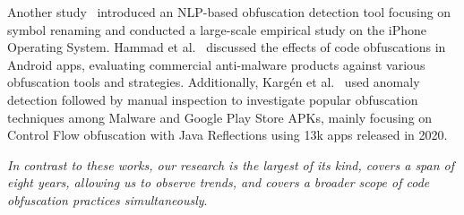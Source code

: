 Another study~\cite{wang2018software} introduced an NLP-based obfuscation detection tool focusing on symbol renaming and conducted a large-scale empirical study on the iPhone Operating System. Hammad et al.~\cite{hammad2018large} discussed the effects of code obfuscations in Android apps, evaluating commercial anti-malware products against various obfuscation tools and strategies. Additionally, Kargén et al.~\cite{kargen2023characterizing} used anomaly detection followed by manual inspection to investigate popular obfuscation techniques among Malware and Google Play Store APKs, mainly focusing on Control Flow obfuscation with Java Reflections using 13k apps released in 2020.

\textit{In contrast to these works, our research is the largest of its kind, covers a span of eight years, allowing us to observe trends, and covers a broader scope of code obfuscation practices simultaneously}.
